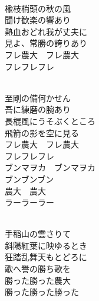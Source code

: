 \documentclass[10pt,b5j]{tarticle} %
\begin{document}
\vspace{1.5em} %
\newcommand{\linespace}{0.5em} %
\newcommand{\blocksize}{0.5\hsize} %
\newcommand{\itemmargin}{3em} %
\begin{enumerate} %
    \setlength{\itemindent}{\itemmargin} %
    \begin{minipage}[c]{\blocksize}
    
        \vspace{\linespace}
        \item~\\
        楡枝梢頭の秋の風\\
        聞け歓楽の響あり\\
        熱血おどれ我が丈夫に\\
        見よ、常勝の誇りあり\\
        フレ農大　フレ農大\\
        フレフレフレ
        
    \end{minipage}
    \begin{minipage}[c]{\blocksize}
        
        \vspace{\linespace}
        \item~\\
        至剛の備何かせん\\
        吾に練磨の腕あり\\
        長棍風にうそぶくところ\\
        飛箭の影を空に見る\\
        フレ農大　フレ農大\\
        フレフレフレ\\
        ブンマヲカ　ブンマヲカ\\
        ブンブンブン\\
        農大　農大\\
        ラーラーラー
        
    \end{minipage}
    \begin{minipage}[c]{\blocksize}
        
        \vspace{\linespace}
        \item~\\
        手稲山の雲さりて\\
        斜陽紅葉に映ゆるとき\\
        狂踏乱舞天もとどろに\\
        歌へ譽の勝ち歌を\\
        勝った勝った農大\\
        勝った勝った勝った
        

\end{minipage}
\end{enumerate}
\end{document}
